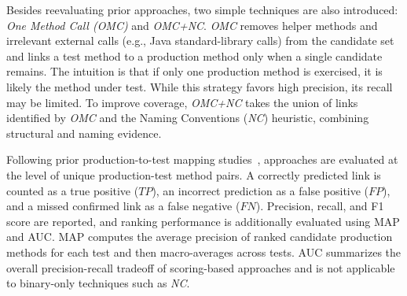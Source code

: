 Besides reevaluating prior approaches, two simple techniques are also introduced: \emph{One Method Call (OMC)} and \emph{OMC+NC}. \emph{OMC} removes helper methods and irrelevant external calls (e.g., Java standard-library calls) from the candidate set and links a test method to a production method only when a single candidate remains. The intuition is that if only one production method is exercised, it is likely the method under test. While this strategy favors high precision, its recall may be limited. To improve coverage, \emph{OMC+NC} takes the union of links identified by \emph{OMC} and the Naming Conventions (\emph{NC}) heuristic, combining structural and naming evidence.


Following prior production-to-test mapping studies~\cite{white_establishing_2020,white_tctracer_2022,sun_method-level_2024}, approaches are evaluated at the level of unique production-test method pairs. A correctly predicted link is counted as a true positive ($TP$), an incorrect prediction as a false positive ($FP$), and a missed confirmed link as a false negative ($FN$). Precision, recall, and F1 score are reported, and ranking performance is additionally evaluated using MAP and AUC. MAP computes the average precision of ranked candidate production methods for each test and then macro-averages across tests. AUC summarizes the overall precision-recall tradeoff of scoring-based approaches and is not applicable to binary-only techniques such as \emph{NC}.



